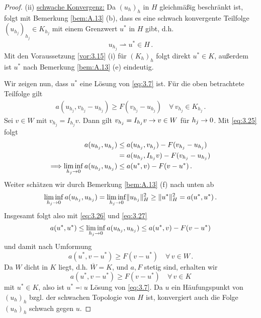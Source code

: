 \begin{proof}
(ii) \underline{schwache Konvergenz:} Da $(u_h)_h$ in $H$ gleichmäßig beschränkt ist, folgt mit Bemerkung \ref{bem:A.13} (b), dass es eine schwach konvergente Teilfolge $(u_{h_j})_{h_j} \in K_{h_j}$ mit einem Grenzwert $u^*$ in $H$ gibt, d.h.
\[
	u_{h_j} \rightharpoonup u^* \in H \, .
\]
Mit den Voraussetzung \ref{vor:3.15} (i) für $(K_h)_h$ folgt direkt $u^* \in K$, außerdem ist $u^*$ nach Bemerkung \ref{bem:A.13} (e) eindeutig.

Wir zeigen nun, dass $u^*$ eine Lösung von \eqref{eq:3.7} ist. Für die oben betrachtete Teilfolge gilt
\begin{align}\label{eq:3.25}
	a(u_{h_j},v_{h_j}-u_{h_j})\ge F(v_{h_j}-u_{h_j}) \quad \forall \, v_{h_j} \in K_{h_j} \, .
\end{align}
Sei $v \in W$ mit $v_{h_j} = I_{h_j} v$. Dann gilt $v_{h_j} = I_{h_j} v \rightarrow v \in W$ für $h_j \rightarrow 0$. Mit \eqref{eq:3.25} folgt
\begin{align}
	\notag a(u_{h_j},u_{h_j}) &\le a(u_{h_j},v_{h_j})-F(v_{h_j}-u_{h_j}) \\
	\notag & = a(u_{h_j},I_{h_j} v)-F(v_{h_j}-u_{h_j}) \\
	\label{eq:3.26} \Longrightarrow \liminf_{h_j\rightarrow 0} a(u_{h_j},u_{h_j}) & \le  a(u^*,v)-F(v-u^*) \, .
\end{align}
Weiter schätzen wir durch Bemerkung \ref{bem:A.13} (f) nach unten ab
\begin{align}\label{eq:3.27}
	\liminf_{h_j\rightarrow 0} a(u_{h_j},u_{h_j}) = \liminf_{h_j\rightarrow 0} \lVert u_{h_j}\rVert_H^2 \ge \lVert u^*\rVert_H^2 = a(u^*,u^*) \, .
\end{align}
Insgesamt folgt also mit \eqref{eq:3.26} und \eqref{eq:3.27}
\[
	a(u^*,u^*) \le \liminf_{h_j\rightarrow 0} a(u_{h_j},u_{h_j}) \le   a(u^*,v)-F(v-u^*)
\]
und damit nach Umformung
\[
	a(u^*,v-u^*)\ge F(v-u^*) \quad \forall \, v \in W \, .
\]
Da $W$ dicht in $K$ liegt, d.h. $\overline W = K$, und $a, F$ stetig sind, erhalten wir
\[
	a(u^*,v-u^*)\ge F(v-u^*) \quad \forall \, v \in K 
\]
mit $u^*\in K$, also ist $u^*\eqqcolon u$ Lösung von \eqref{eq:3.7}. Da $u$ ein Häufungspunkt von $(u_h)_h$ bzgl. der schwachen Topologie von $H$ ist, konvergiert auch die Folge $(u_h)_h$ schwach gegen $u$.


\end{proof}
